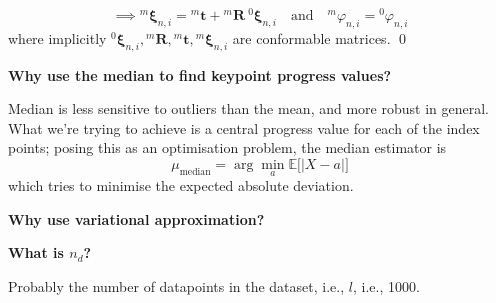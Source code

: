 \begin{equation}
    \implies
    {}^{m}\boldsymbol{\xi}_{n, i}
    =
    {}^{m}\boldsymbol{t} + {}^{m}\boldsymbol{R} \ {}^{0}\boldsymbol{\xi}_{n, i}
    \quad \text{and} \quad
    \boxed{
    {}^{m}\varphi_{n, i}
                =
                {}^{0}\varphi_{n, i}
        }
\end{equation}
where implicitly \( {}^{0}\boldsymbol{\xi}_{n, i}, {}^{m}\boldsymbol{R}, {}^{m}\boldsymbol{t}, {}^{m}\boldsymbol{\xi}_{n, i} \) are conformable matrices.
\qed{}

\vspace{1em}
\textbf{Why use the median to find keypoint progress values?}

Median is less sensitive to outliers than the mean, and more robust in general.
What we're trying to achieve is a central progress value for each of the index points; posing this as an optimisation problem, the median estimator is
\begin{equation}
    \mu_{\text{median}} = \arg \min_{a} \mathbb{E} \Big[ \big \vert X - a \big \vert \Big]
\end{equation}
which tries to minimise the expected absolute deviation.

\vspace{1em}
\textbf{Why use variational approximation?}

\vspace{1em}
\textbf{What is \( n_d \)?}

Probably the number of datapoints in the dataset, i.e., \( l \), i.e., 1000.

